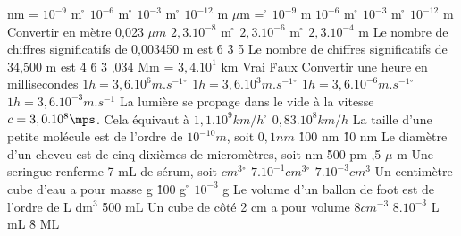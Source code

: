  nm =
\rv
$10^{-9}$ m
\r
$10^{-6}$ m
\r
$10^{-3}$ m
\r
$10^{-12}$ m
 $\mu$m =
\r
$10^{-9}$ m
\rv
$10^{-6}$ m
\r
$10^{-3}$ m
\r
$10^{-12}$ m
\q
Convertir en mètre 0,023 $\mu m $
\rv
$2,3. 10^{-8}$ m
\r
$2,3. 10^{-6}$ m
\r
$2,3. 10^{-4}$ m
\q
Le nombre de chiffres significatifs de 0,003450 m est
\r
6
\r
3
\r
5
\q
Le nombre de chiffres significatifs de 34,500 m est
\r
4
\r
6
\r
3
,034 Mm = $3,4.10^1$ km
\rv
Vrai
\r
Faux
\q
Convertir une heure en millisecondes
\rv
$1 h = 3,6.10^6 m.s^{-1}$
\r
$1 h = 3,6.10^3 m.s^{-1}$
\r
$1 h = 3,6.10^{-6} m.s^{-1}$
\r
$1 h = 3,6.10^{-3} m.s^{-1}$
\q
La lumière se propage dans le vide à  la vitesse $c=3,0.10^8\mps$.
Cela équivaut à  
\rv
$1,1.10^9 km/h$
\r
$0,83.10^8 km/h$
\q
La taille d'une petite molécule	est de l'ordre de $10^{-10} m$, soit
\rv
$0,1 nm$
\r
100 nm
\r
10 nm	
\q
Le diamètre d'un cheveu	est de cinq dixièmes de micromètres, soit
 nm
\r
500 pm
,5 $\mu$ m
\q 
Une seringue renferme 7 mL de sérum, soit
 $cm^{3}$
\r
$7.10^{-1}cm^{3}$
\r
$7.10^{-3}cm^{3}$
\q
Un centimètre cube d'eau a pour masse
 g
\r
100 g
\r
$10^{-3}$ g
\q
Le volume d'un ballon de foot est de l'ordre de 
 L
 dm$^{3}$
\r
500 mL
\q
Un cube de côté 2 cm a pour volume
\rv
$8 cm^{-3}$
\rv
$8.10^{-3}$ L 
 mL
\r
8 ML
